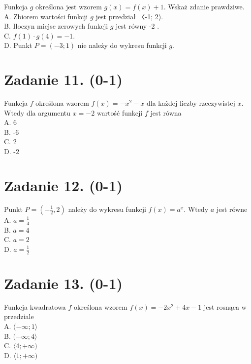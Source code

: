 \documentclass[10pt]{article}
\begin{document}
Funkcja \(g\) określona jest wzorem \(g(x)=f(x)+1\). Wskaż zdanie prawdziwe.\\
A. Zbiorem wartości funkcji \(g\) jest przedział 〈-1; 2).\\
B. Iloczyn miejsc zerowych funkcji \(g\) jest równy -2 .\\
C. \(f(1) \cdot g(4)=-1\).\\
D. Punkt \(P=(-3 ; 1)\) nie należy do wykresu funkcji \(g\).

\section*{Zadanie 11. (0-1)}
Funkcja \(f\) określona wzorem \(f(x)=-x^{2}-x\) dla każdej liczby rzeczywistej \(x\). Wtedy dla argumentu \(x=-2\) wartość funkcji \(f\) jest równa\\
A. 6\\
B. -6\\
C. 2\\
D. -2

\section*{Zadanie 12. (0-1)}
Punkt \(P=\left(-\frac{1}{2}, 2\right)\) należy do wykresu funkcji \(f(x)=a^{x}\). Wtedy \(a\) jest równe\\
A. \(a=\frac{1}{4}\)\\
B. \(a=4\)\\
C. \(a=2\)\\
D. \(a=\frac{1}{2}\)

\section*{Zadanie 13. (0-1)}
Funkcja kwadratowa \(f\) określona wzorem \(f(x)=-2 x^{2}+4 x-1\) jest rosnąca w przedziale\\
A. \((-\infty ; 1\rangle\)\\
B. \((-\infty ; 4\rangle\)\\
C. \(\langle 4 ;+\infty)\)\\
D. \(\langle 1 ;+\infty)\)
\end{document}

